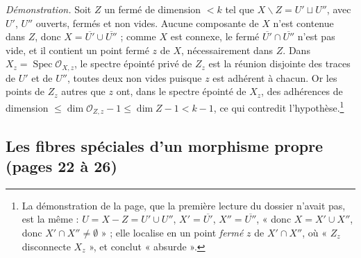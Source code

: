 \documentclass[11pt,a4paper]{article}
\begin{document}
\emph{Démonstration.} Soit $Z$ un fermé de dimension $< k$ tel que
$X \smallsetminus Z = U' \sqcup U''$, avec $U'$, $U''$ ouverts, fermés et non
vides. Aucune composante de $X$ n'est contenue dans $Z$, donc
$X = \overline{U'} \cup \overline{U''}$ ; comme $X$ est connexe, le fermé
$\overline{U'} \cap \overline{U''}$ n'est pas vide, et il contient un point
fermé $z$ de $X$, nécessairement dans $Z$. Dans
$X_z = \operatorname{Spec} \mathcal{O}_{X,z}$, le spectre épointé privé de
$Z_z$ est la réunion disjointe des traces de $U'$ et de $U''$, toutes deux non
vides puisque $z$ est adhérent à chacun. Or les points de $Z_z$ autres que $z$
ont, dans le spectre épointé de $X_z$, des adhérences de dimension
$\leq \dim \mathcal{O}_{Z,z} - 1 \leq \dim Z - 1 < k - 1$, ce qui contredit
l'hypothèse.\footnote{La démonstration de la page, que la première lecture
du dossier n'avait pas, est la même : $U = X - Z = U' \cup U''$, $X' =
\overline{U'}$, $X'' = \overline{U''}$, « donc $X = X' \cup X''$, donc $X'
\cap X'' \neq \emptyset$ » ; elle localise en un point \emph{fermé} $z$ de
$X' \cap X''$, où « $Z_z$ disconnecte $X_z$ », et conclut « absurde ».}

\subsection*{Les fibres spéciales d'un morphisme propre (pages 22 à 26)}
\end{document}
